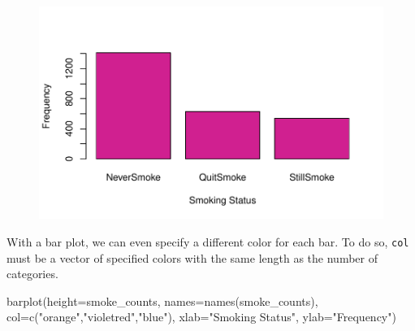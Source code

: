\documentclass[
  letterpaper,
]{krantz}
\makeatletter
\newenvironment{Shaded}{\begin{snugshade}}{\end{snugshade}}
\newcommand{\AttributeTok}[1]{\textcolor[rgb]{0.40,0.45,0.13}{#1}}
\newcommand{\FunctionTok}[1]{\textcolor[rgb]{0.28,0.35,0.67}{#1}}
\newcommand{\NormalTok}[1]{\textcolor[rgb]{0.00,0.23,0.31}{#1}}
\newcommand{\OtherTok}[1]{\textcolor[rgb]{0.00,0.23,0.31}{#1}}
\newcommand{\SpecialCharTok}[1]{\textcolor[rgb]{0.37,0.37,0.37}{#1}}
\newcommand{\StringTok}[1]{\textcolor[rgb]{0.13,0.47,0.30}{#1}}
\newenvironment{kframe}{%
\medskip{}
\setlength{\fboxsep}{.8em}
 \def\at@end@of@kframe{}%
 \ifinner\ifhmode%
  \def\at@end@of@kframe{\end{minipage}}%
  \begin{minipage}{\columnwidth}%
 \fi\fi%
 \def\FrameCommand##1{\hskip\@totalleftmargin \hskip-\fboxsep
 \colorbox{shadecolor}{##1}\hskip-\fboxsep
     \hskip-\linewidth \hskip-\@totalleftmargin \hskip\columnwidth}%
 \MakeFramed {\advance\hsize-\width
   \@totalleftmargin\z@ \linewidth\hsize
   \@setminipage}}%
 {\par\unskip\endMakeFramed%
 \at@end@of@kframe}
\renewenvironment{Shaded}{\begin{kframe}}{\end{kframe}}
\makeatother
\begin{document}
\begin{Shaded}
\end{Shaded}

\begin{figure}[H]

{\centering \includegraphics[width=1\textwidth,height=\textheight]{book/4_exploratory_analysis_files/figure-pdf/unnamed-chunk-10-1.pdf}

}

\end{figure}

With a bar plot, we can even specify a different color for each bar. To
do so, \texttt{col} must be a vector of specified colors with the same
length as the number of categories.

\begin{Shaded}
\begin{Highlighting}[]
\FunctionTok{barplot}\NormalTok{(}\AttributeTok{height=}\NormalTok{smoke\_counts, }\AttributeTok{names=}\FunctionTok{names}\NormalTok{(smoke\_counts), }
        \AttributeTok{col=}\FunctionTok{c}\NormalTok{(}\StringTok{"orange"}\NormalTok{,}\StringTok{"violetred"}\NormalTok{,}\StringTok{"blue"}\NormalTok{),}
        \AttributeTok{xlab=}\StringTok{"Smoking Status"}\NormalTok{, }\AttributeTok{ylab=}\StringTok{"Frequency"}\NormalTok{)}
\end{Highlighting}
\end{Shaded}
\end{document}
